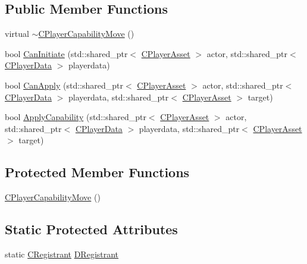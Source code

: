 \subsection*{Public Member Functions}
\begin{DoxyCompactItemize}
\item 
virtual \hyperlink{classCPlayerCapabilityMove_ab355e3a0f8c82ee10b5ccf95c9e32d89}{$\sim$\+C\+Player\+Capability\+Move} ()
\item 
bool \hyperlink{classCPlayerCapabilityMove_aef25bc0d224e993c46f5cd4cd6b8b7c8}{Can\+Initiate} (std\+::shared\+\_\+ptr$<$ \hyperlink{classCPlayerAsset}{C\+Player\+Asset} $>$ actor, std\+::shared\+\_\+ptr$<$ \hyperlink{classCPlayerData}{C\+Player\+Data} $>$ playerdata)
\item 
bool \hyperlink{classCPlayerCapabilityMove_a76cbb0fa4051961c00e3169d11d76568}{Can\+Apply} (std\+::shared\+\_\+ptr$<$ \hyperlink{classCPlayerAsset}{C\+Player\+Asset} $>$ actor, std\+::shared\+\_\+ptr$<$ \hyperlink{classCPlayerData}{C\+Player\+Data} $>$ playerdata, std\+::shared\+\_\+ptr$<$ \hyperlink{classCPlayerAsset}{C\+Player\+Asset} $>$ target)
\item 
bool \hyperlink{classCPlayerCapabilityMove_ade3f4e72612cbf2ad73a6c2e6aa843df}{Apply\+Capability} (std\+::shared\+\_\+ptr$<$ \hyperlink{classCPlayerAsset}{C\+Player\+Asset} $>$ actor, std\+::shared\+\_\+ptr$<$ \hyperlink{classCPlayerData}{C\+Player\+Data} $>$ playerdata, std\+::shared\+\_\+ptr$<$ \hyperlink{classCPlayerAsset}{C\+Player\+Asset} $>$ target)
\end{DoxyCompactItemize}
\subsection*{Protected Member Functions}
\begin{DoxyCompactItemize}
\item 
\hyperlink{classCPlayerCapabilityMove_a6bfe72663b6b5fc708d23373dc293ec7}{C\+Player\+Capability\+Move} ()
\end{DoxyCompactItemize}
\subsection*{Static Protected Attributes}
\begin{DoxyCompactItemize}
\item 
static \hyperlink{classCPlayerCapabilityMove_1_1CRegistrant}{C\+Registrant} \hyperlink{classCPlayerCapabilityMove_a6b1de1f3d299621bc3d6020111bb8253}{D\+Registrant}
\end{DoxyCompactItemize}
